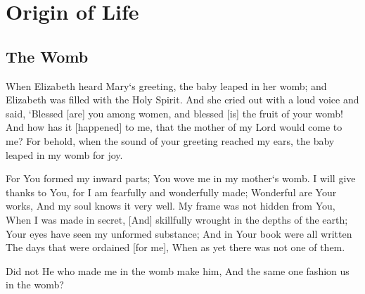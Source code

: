 \chapter{Origin of Life}
\section{The Womb}

\begin{scripture}[Luke 1:41-44]
    When Elizabeth heard Mary`s greeting, the baby leaped in her womb; and Elizabeth was filled with the Holy Spirit.    
        And she cried out with a loud voice and said, `Blessed [are] you among women, and blessed [is] the fruit of your womb!
        And how has it [happened] to me, that the mother of my Lord would come to me?
        For behold, when the sound of your greeting reached my ears, the baby leaped in my womb for joy.
 \end{scripture}

\vspace{1\baselineskip}


\begin{scripture}[Psalm 139:13-16]
    For You formed my inward parts; You wove me in my mother`s womb.  
    I will give thanks to You, for I am fearfully and wonderfully made; Wonderful are Your works, And my soul knows it very well.  
    My frame was not hidden from You, When I was made in secret, [And] skillfully wrought in the depths of the earth;  
    Your eyes have seen my unformed substance; And in Your book were all written The days that were ordained [for me], When as yet there was not one of them.  
\end{scripture}

\vspace{2\baselineskip}

\begin{scripture}[Job 31:15]
    Did not He who made me in the womb make him, And the same one fashion us in the womb?
\end{scripture}

